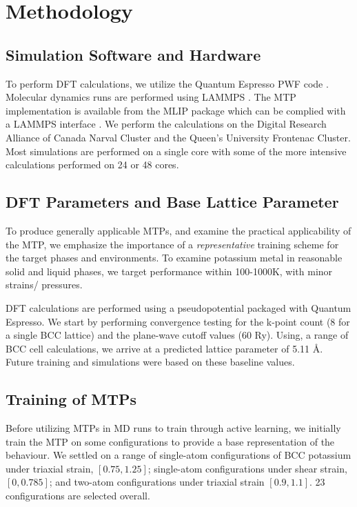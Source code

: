 \documentclass[9pt,twocolumn,twoside]{opticajnl}
\begin{document}
\section{Methodology}

\subsection{Simulation Software and Hardware}
To perform DFT calculations, we utilize the Quantum Espresso PWF code \cite{QE}. Molecular dynamics runs are performed using LAMMPS  \cite{LAMMPS}. The MTP implementation is available from the MLIP package which can be complied with a LAMMPS interface \cite{mlip}. We perform the calculations on the Digital Research Alliance of Canada Narval Cluster and the Queen's University Frontenac Cluster. Most simulations are performed on a single core with some of the more intensive calculations performed on 24 or 48 cores. 

\subsection{DFT Parameters and Base Lattice Parameter}
To produce generally applicable MTPs, and examine the practical applicability of the MTP, we emphasize the importance of a \textit{representative} training scheme for the target phases and environments. To examine potassium metal in reasonable solid and liquid phases, we target performance within 100-1000K, with minor strains/ pressures.

DFT calculations are performed using a pseudopotential packaged with Quantum Espresso\cite{DFT}. We start by performing convergence testing for the k-point count (8 for a single BCC lattice) and the plane-wave cutoff values (60 Ry). Using, a range of BCC cell calculations, we arrive at a predicted lattice parameter of 5.11 Å. Future training and simulations were based on these baseline values. 

\subsection{Training of MTPs}
Before utilizing MTPs in MD runs to train through active learning, we initially train the MTP on some configurations to provide a base representation of the behaviour. We settled on a range of single-atom configurations of BCC potassium under triaxial strain, $[0.75, 1.25]$; single-atom configurations under shear strain, $[0, 0.785]$; and two-atom configurations under triaxial strain $[0.9, 1.1]$. 23 configurations are selected overall.
\end{document}
